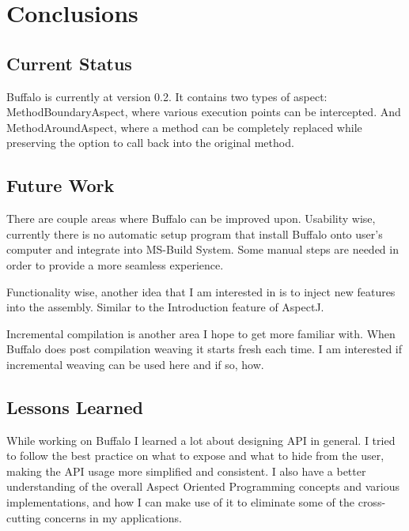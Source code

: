\chapter{Conclusions}
\section{Current Status}

Buffalo is currently at version 0.2. It contains two types of aspect: MethodBoundaryAspect, where various execution points can be intercepted. And MethodAroundAspect, where a method can be completely replaced while preserving the option to call back into the original method.

\section{Future Work}

There are couple areas where Buffalo can be improved upon. Usability wise, currently there is no automatic setup program that install Buffalo onto user’s computer and integrate into MS-Build System. Some manual steps are needed in order to provide a more seamless experience.

Functionality wise, another idea that I am interested in is to inject new features into the assembly. Similar to the Introduction feature of AspectJ. 

Incremental compilation is another area I hope to get more familiar with. When Buffalo does post compilation weaving it starts fresh each time. I am interested if incremental weaving can be used here and if so, how.

\section{Lessons Learned}

While working on Buffalo I learned a lot about designing API in general. I tried to follow the best practice on what to expose and what to hide from the user, making the API usage more simplified and consistent. I also have a better understanding of the overall Aspect Oriented Programming concepts and various implementations, and how I can make use of it to eliminate some of the cross-cutting concerns in my applications.
